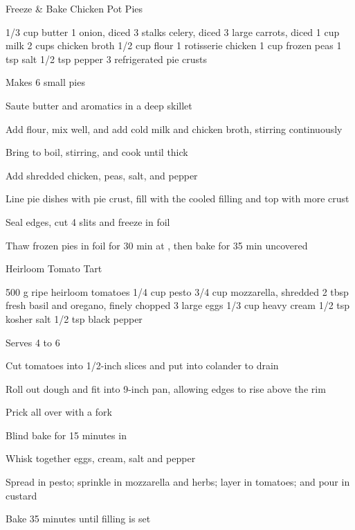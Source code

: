 
\begin{denserecipe}{Freeze \& Bake Chicken Pot Pies}{}
\begin{ingredients}
1/3 cup butter
1 onion, diced
3 stalks celery, diced
3 large carrots, diced
1 cup milk
2 cups chicken broth
1/2 cup flour
1 rotisserie chicken
1 cup frozen peas
1 tsp salt
1/2 tsp pepper
3 refrigerated pie crusts
\end{ingredients}
\nextcolumn
Makes 6 small pies
\begin{steps}
    \item Saute butter and aromatics in a deep skillet
    \item Add flour, mix well, and add cold milk and chicken broth, stirring continuously
    \item Bring to boil, stirring, and cook until thick
    \item Add shredded chicken, peas, salt, and pepper
    \item Line pie dishes with pie crust, fill with the cooled filling and top with more crust
    \item Seal edges, cut 4 slits and freeze in foil
    \item Thaw frozen pies in foil for 30 min at , then bake for 35 min uncovered
\end{steps}
\end{denserecipe}

\begin{denserecipe}{Heirloom Tomato Tart}{}
\begin{ingredients}
500 g ripe heirloom tomatoes
1/4 cup pesto
3/4 cup mozzarella, shredded
2 tbsp fresh basil and oregano, finely chopped
3 large eggs
1/3 cup heavy cream
1/2 tsp kosher salt
1/2 tsp black pepper
\end{ingredients}
\nextcolumn
Serves 4 to 6
\begin{steps}
    \item Cut tomatoes into 1/2-inch slices and put into colander to drain
    \item Roll out dough and fit into 9-inch pan, allowing edges to rise above the rim
    \item Prick all over with a fork
    \item Blind bake for 15 minutes in 
    \item Whisk together eggs, cream, salt and pepper
    \item Spread in pesto; sprinkle in mozzarella and herbs; layer in tomatoes; and pour in custard
    \item Bake 35 minutes until filling is set
\end{steps}
\end{denserecipe}

